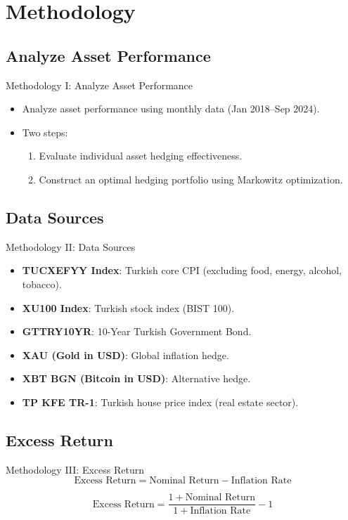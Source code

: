 \documentclass{beamer}
\begin{document}
\section{Methodology}
\subsection{Analyze Asset Performance}
\begin{frame}{Methodology I: Analyze Asset Performance}
\begin{itemize}
\tightlist
\item Analyze asset performance using monthly data (Jan 2018--Sep 2024).
\item Two steps:
\begin{enumerate}
\item Evaluate individual asset hedging effectiveness.
\item Construct an optimal hedging portfolio using Markowitz optimization.
\end{enumerate}
\end{itemize}
\end{frame}

\subsection{Data Sources}
\begin{frame}{Methodology II: Data Sources}
\begin{itemize}
\tightlist
\item \textbf{TUCXEFYY Index}: Turkish core CPI (excluding food, energy,
alcohol, tobacco).
\item \textbf{XU100 Index}: Turkish stock index (BIST 100).
\item \textbf{GTTRY10YR}: 10-Year Turkish Government Bond.
\item \textbf{XAU (Gold in USD)}: Global inflation hedge.
\item \textbf{XBT BGN (Bitcoin in USD)}: Alternative hedge.
\item \textbf{TP KFE TR-1}: Turkish house price index (real estate sector).
\end{itemize}
\end{frame}

\subsection{Excess Return}
\begin{frame}{Methodology III: Excess Return}
\[
\text{Excess Return} = \text{Nominal Return} - \text{Inflation Rate}
\]

\[
\text{Excess Return} = \frac{1 + \text{Nominal Return}}{1 + \text{Inflation Rate}} - 1
\]
\end{frame}
\end{document}
